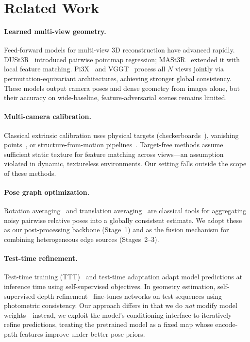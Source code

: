 \section{Related Work}
\label{sec:related}

\paragraph{Learned multi-view geometry.} Feed-forward models for multi-view 3D reconstruction have advanced rapidly. DUSt3R~\cite{dust3r} introduced pairwise pointmap regression; MASt3R~\cite{mast3r} extended it with local feature matching. Pi3X~\cite{pi3x} and VGGT~\cite{vggt} process all $N$ views jointly via permutation-equivariant architectures, achieving stronger global consistency. These models output camera poses and dense geometry from images alone, but their accuracy on wide-baseline, feature-adversarial scenes remains limited.

\paragraph{Multi-camera calibration.} Classical extrinsic calibration uses physical targets (checkerboards~\cite{zhang2000}), vanishing points~\cite{cipolla1999}, or structure-from-motion pipelines~\cite{schonberger2016}. Target-free methods assume sufficient static texture for feature matching across views---an assumption violated in dynamic, textureless environments. Our setting falls outside the scope of these methods.

\paragraph{Pose graph optimization.} Rotation averaging~\cite{hartley2013,chatterjee2018} and translation averaging~\cite{moulon2013} are classical tools for aggregating noisy pairwise relative poses into a globally consistent estimate. We adopt these as our post-processing backbone (Stage~1) and as the fusion mechanism for combining heterogeneous edge sources (Stages~2--3).

\paragraph{Test-time refinement.} Test-time training (TTT)~\cite{sun2020} and test-time adaptation adapt model predictions at inference time using self-supervised objectives. In geometry estimation, self-supervised depth refinement~\cite{godard2019} fine-tunes networks on test sequences using photometric consistency. Our approach differs in that we do \emph{not} modify model weights---instead, we exploit the model's conditioning interface to iteratively refine predictions, treating the pretrained model as a fixed map whose encode-path features improve under better pose priors.

